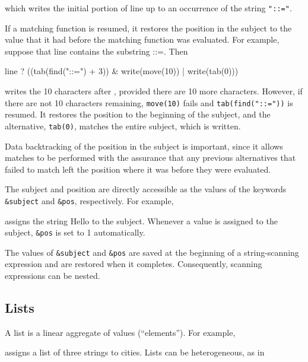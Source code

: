 \noindent which writes the initial portion of line up to an occurrence
of the string \texttt{"::="}.

If a matching function is resumed, it restores the position in the
subject to the value that it had before the matching function was
evaluated. For example, suppose that line contains the substring
{\textquotedbl}::={\textquotedbl}. Then

\begin{iconcode}
\>line ? ((tab(find("::=") + 3)) \& write(move(10)) | write(tab(0)))
\end{iconcode}

\noindent writes the 10 characters after , provided there
are 10 more characters. However, if there are not 10 characters
remaining, \texttt{move(10)} fails and \texttt{tab(find("::="))} is
resumed. It restores the position to the beginning of the subject, and
the alternative, \texttt{tab(0)}, matches the entire subject, which is
written.

Data backtracking of the position in the subject is important, since
it allows matches to be performed with the assurance that any previous
alternatives that failed to match left the position where it was
before they were evaluated.

The subject and position are directly accessible as the values of the
keywords \texttt{\&subject} and \texttt{\&pos}, respectively. For example,


\noindent assigns the string {\textquotedbl}Hello{\textquotedbl} to
the subject. Whenever a value is assigned to the subject, \texttt{\&pos} is set
to 1 automatically.

The values of \texttt{\&subject} and \texttt{\&pos} are saved at the
beginning of a string-scanning expression and are restored when it
completes. Consequently, scanning expressions can be nested.


\subsection{Lists}

A list is a linear aggregate of values (``elements''). For example,


\noindent
assigns a list of three strings to cities. Lists can be heterogeneous, as in


